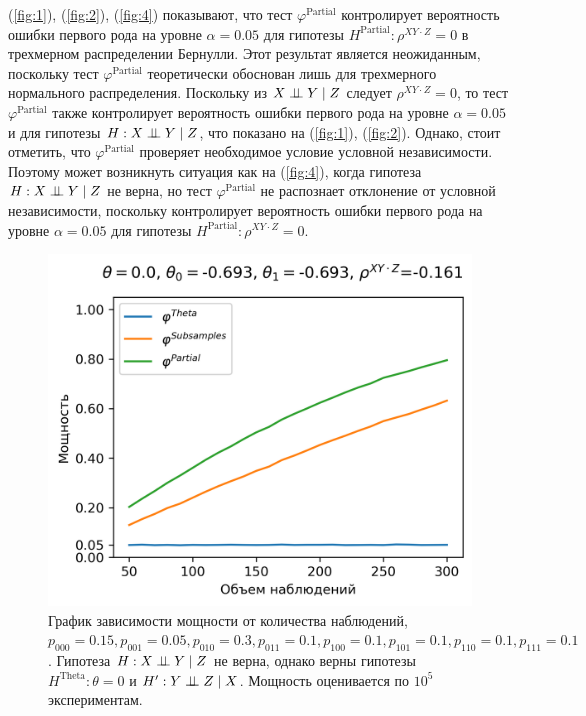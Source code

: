 (\autoref{fig:1}), (\autoref{fig:2}), (\autoref{fig:4}) показывают,
что тест $\varphi^{\text{Partial}}$ контролирует вероятность
ошибки первого рода на уровне $\alpha=0.05$ для гипотезы
$H^\text{Partial}: \rho^{XY\cdot Z}=0$ в трехмерном
распределении Бернулли. Этот результат является неожиданным,
поскольку тест $\varphi^{\text{Partial}}$ теоретически обоснован
лишь для трехмерного нормального распределения.
Поскольку из $X \perp\!\!\!\perp Y \mid Z$
следует $\rho^{XY\cdot Z}=0$, то тест $\varphi^{\text{Partial}}$ также
контролирует вероятность ошибки первого рода на уровне $\alpha=0.05$
и для гипотезы $H: X \perp\!\!\!\perp Y \mid Z$, что показано на 
(\autoref{fig:1}), (\autoref{fig:2}).
Однако, стоит отметить,
что $\varphi^{\text{Partial}}$ проверяет необходимое условие 
условной независимости. Поэтому может возникнуть ситуация
как на (\autoref{fig:4}), когда гипотеза $H: X \perp\!\!\!\perp Y \mid Z$ не верна, 
но тест $\varphi^{\text{Partial}}$ не распознает отклонение от условной независимости, поскольку
контролирует вероятность ошибки первого рода 
на уровне $\alpha=0.05$ для гипотезы $H^{\text{Partial}}: \rho^{XY\cdot Z}=0$.

\begin{figure}[H]
    \centering
    \includegraphics[scale=0.55]{images/graph5.png}
    \caption{График зависимости мощности от количества наблюдений,
    $p_{000}=0.15, p_{001}=0.05, 
    p_{010}=0.3, p_{011}=0.1,
    p_{100}=0.1, p_{101}=0.1, p_{110}=0.1, p_{111}=0.1$. 
    Гипотеза $H: X \perp\!\!\!\perp Y \mid Z$ не верна, однако верны гипотезы $H^{\text{Theta}}: \theta=0$
    и $H^{\prime}: Y \perp\!\!\!\perp Z \mid X$.
    Мощность оценивается по $10^5$ экспериментам.} \label{fig:5}
\end{figure}

